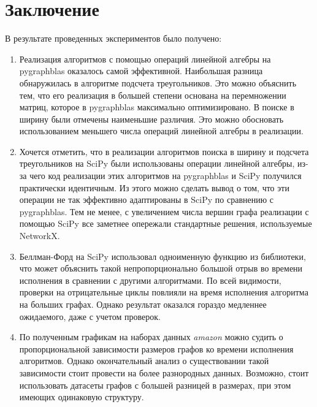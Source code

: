 \section{Заключение}

В результате проведенных экспериментов было получено:

\begin{enumerate}
    \item Реализация алгоритмов с помощью операций линейной алгебры на pygraphblas оказалось самой эффективной. 
    Наибольшая разница обнаружилась в алгоритме подсчета треугольников. Это можно объяснить тем, что его реализация 
    в большей степени основана на перемножении матриц, которое в pygraphblas максимально оптимизировано.
    В поиске в ширину были отмечены наименьшие различия. Это можно обосновать использованием меньшего числа операций 
    линейной алгебры в реализации.
    
    \item Хочется отметить, что в реализации алгоритмов поиска в ширину и подсчета треугольников на SciPy были использованы 
    операции линейной алгебры, из-за чего код реализации этих алгоритмов на pygraphblas и SciPy получился практически идентичным. 
    Из этого можно сделать вывод о том, что эти операции не так эффективно адаптированы в SciPy по сравнению с pygraphblas. 
    Тем не менее, с увеличением числа вершин графа реализации с помощью SciPy все заметнее опережали стандартные решения, 
    используемые NetworkX. 
    
    \item Беллман-Форд на SciPy использовал одноименную функцию из библиотеки\cite{csgraph}, что может объяснить такой 
    непропорционально большой отрыв во времени исполнения в сравнении с другими алгоритмами. По всей видимости, проверки 
    на отрицательные циклы повлияли на время исполнения алгоритма на больших графах. Однако результат оказался гораздо 
    медленнее ожидаемого, даже с учетом проверок.
    
    \item По полученным графикам на наборах данных \textit{amazon} можно судить о пропорциональной зависимости размеров 
    графов ко времени исполнения алгоритмов. Однако окончательный анализ о существовании такой зависимости стоит провести 
    на более разнородных данных. Возможно, стоит использовать датасеты графов с большей разницей в размерах, при этом имеющих 
    одинаковую структуру.
\end{enumerate}